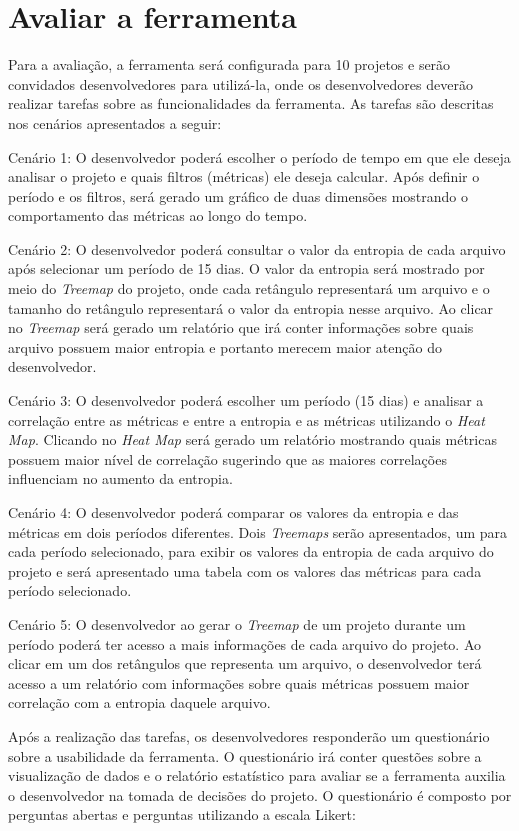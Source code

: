 \section{Avaliar a ferramenta}
Para a avaliação, a ferramenta será configurada para 10 projetos e serão convidados desenvolvedores para utilizá-la, onde os desenvolvedores deverão realizar tarefas sobre as funcionalidades da ferramenta. As tarefas são descritas nos cenários apresentados a seguir:

Cenário 1: O desenvolvedor poderá escolher o período de tempo em que ele deseja analisar o projeto e quais filtros (métricas) ele deseja calcular. Após definir o período e os filtros, será gerado um gráfico de duas dimensões mostrando o comportamento das métricas ao longo do tempo. 

Cenário 2: O desenvolvedor poderá consultar o valor da entropia de cada arquivo após selecionar um período de 15 dias. O valor da entropia será mostrado por meio do \textit{Treemap} do projeto, onde cada retângulo representará um arquivo e o tamanho do retângulo representará o valor da entropia nesse arquivo. Ao clicar no \textit{Treemap} será gerado um relatório que irá conter informações sobre quais arquivo possuem maior entropia e portanto merecem maior atenção do desenvolvedor.

Cenário 3: O desenvolvedor poderá escolher um período (15 dias) e analisar a correlação entre as métricas e entre a entropia e as métricas utilizando o \textit{Heat Map}. Clicando no \textit{Heat Map} será gerado um relatório mostrando quais métricas possuem maior nível de correlação sugerindo que as maiores correlações influenciam no aumento da entropia.

Cenário 4: O desenvolvedor poderá comparar os valores da entropia e das métricas em dois períodos diferentes. Dois \textit{Treemaps} serão apresentados, um para cada período selecionado, para exibir os valores da entropia de cada arquivo do projeto e será apresentado uma tabela com os valores das métricas para cada período selecionado.

Cenário 5: O desenvolvedor ao gerar o \textit{Treemap} de um projeto durante um período poderá ter acesso a mais informações de cada arquivo do projeto. Ao clicar em um dos retângulos que representa um arquivo, o desenvolvedor terá acesso a um relatório com informações sobre quais métricas possuem maior correlação com a entropia daquele arquivo.

Após a realização das tarefas, os desenvolvedores responderão um questionário sobre a usabilidade da ferramenta. O questionário irá conter questões sobre a visualização de dados e o relatório estatístico para avaliar se a ferramenta auxilia o desenvolvedor na tomada de decisões do projeto. O questionário é composto por perguntas abertas e perguntas utilizando a escala Likert:

